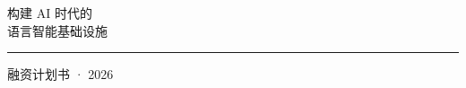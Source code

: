 \begin{frame}[plain]

\vspace*{1.25cm}

\begin{center}


\vspace{0.95cm}

{\SBFontTitle\fontsize{24}{30}\selectfont\color{SBText}

构建 AI 时代的\\[0.10cm]

语言智能基础设施

}

\vspace{0.90cm}

{\color{SBPrimary}\rule{2.8cm}{1.4pt}}

\vspace{0.90cm}

{\SBFontBody\fontsize{10}{12}\selectfont\color{SBGray}

融资计划书 · 2026

}

\end{center}

\vfill

\SBFixedFooter

\end{frame}